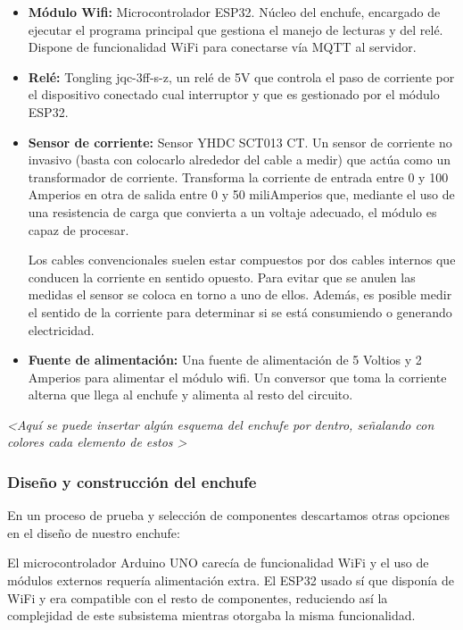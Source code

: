 \documentclass[a4paper,10pt]{article}
\begin{document}
\begin{itemize}
\item{\textbf{Módulo Wifi:} Microcontrolador
  ESP32\cite{ESP32SeriesDatasheet}. Núcleo del enchufe, encargado de
  ejecutar el programa principal que gestiona el manejo de lecturas y
  del relé. Dispone de funcionalidad WiFi para conectarse vía MQTT al
  servidor.}

\item{\textbf{Relé:} Tongling jqc-3ff-s-z, un relé de 5V que controla
  el paso de corriente por el dispositivo conectado cual interruptor y
  que es gestionado por el módulo ESP32.}

\item{\textbf{Sensor de corriente:} Sensor YHDC SCT013
  CT\cite{SCT013000DatasheetPDF}. Un sensor de corriente no invasivo
  (basta con colocarlo alrededor del cable a medir) que actúa como un
  transformador de corriente. Transforma la corriente de entrada entre
  0 y 100 Amperios en otra de salida entre 0 y 50 miliAmperios que,
  mediante el uso de una resistencia de carga que convierta a un
  voltaje adecuado, el módulo es capaz de procesar.

  Los cables convencionales suelen estar compuestos por dos cables
  internos que conducen la corriente en sentido opuesto. Para evitar
  que se anulen las medidas el sensor se coloca en torno a uno de
  ellos. Además, es posible medir el sentido de la corriente para
  determinar si se está consumiendo o generando electricidad.}

\item{\textbf{Fuente de alimentación:} Una fuente de alimentación de
  5 Voltios y 2 Amperios para alimentar el módulo wifi. Un conversor
  que toma la corriente alterna que llega al enchufe y alimenta al
  resto del circuito.}
\end{itemize}

\textit{\textless Aquí se puede insertar algún esquema del enchufe por
  dentro, señalando con colores cada elemento de estos \textgreater}

\subsubsection{Diseño y construcción del enchufe}

En un proceso de prueba y selección de componentes descartamos otras
opciones en el diseño de nuestro enchufe:

El microcontrolador Arduino UNO carecía de funcionalidad WiFi y el uso de módulos
externos requería alimentación extra. El ESP32 usado sí que disponía
de WiFi y era compatible con el resto de componentes, reduciendo así
la complejidad de este subsistema mientras otorgaba la misma funcionalidad.
\end{document}
